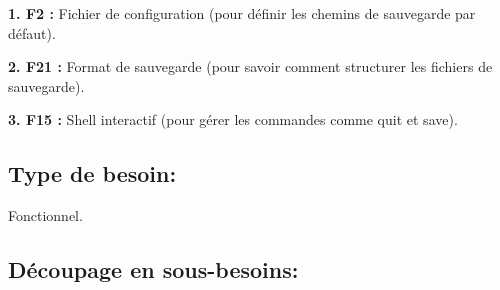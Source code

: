 \documentclass[a4paper]{article}
\begin{document}
\hangindent=1.5cm
\textbf{1. F2 :} Fichier de configuration (pour définir les chemins de sauvegarde par défaut).


\hangindent=1.5cm
\textbf{2. F21 :} Format de sauvegarde (pour savoir comment structurer les fichiers de sauvegarde).


\hangindent=1.5cm
\textbf{3. F15 :} Shell interactif (pour gérer les commandes comme quit et save).


\hangindent=0.8mm
\subsection{Type de besoin:}

\hangindent=1.5cm
Fonctionnel.

\hangindent=0.8mm
\subsection{Découpage en sous-besoins:}
\end{document}
